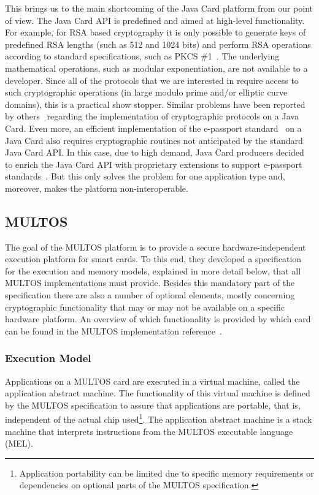 This brings us to the main shortcoming of the Java Card platform from our point
of view. The Java Card API is predefined and aimed at high-level functionality.
For example, for RSA based cryptography it is only possible to generate keys of
predefined RSA lengths (such as 512 and 1024 bits) and perform RSA operations
according to standard specifications, such as PKCS \#1~\cite{PKCS_1}. The
underlying mathematical operations, such as modular exponentiation, are not
available to a developer. Since all of the protocols that we are interested in
require access to such cryptographic operations (in large modulo prime and/or
elliptic curve domains), this is a practical show stopper. Similar problems have
been reported by others~\cite{BichselCGS2009,Sterckx09} regarding the implementation of
cryptographic protocols on a Java Card. Even more, an efficient implementation
of the e-passport standard~\cite{EAC20} on a Java Card also requires
cryptographic routines not anticipated by the standard Java Card API. In this
case, due to high demand, Java Card producers decided to enrich the Java Card
API with proprietary extensions to support e-passport standards~\cite{NXP09}.
But this only solves the problem for one application type and, moreover, makes
the platform non-interoperable.

\subsection{MULTOS}\label{sec:multos}

The goal of the MULTOS platform is to provide a secure hardware-independent
execution platform for smart cards. To this end, they developed a specification
for the execution and memory models, explained in more detail below, that all
MULTOS implementations must provide. Besides this mandatory part of the
specification there are also a number of optional elements, mostly concerning
cryptographic functionality that may or may not be available on a specific
hardware platform. An overview of which functionality is provided by which card
can be found in the MULTOS implementation reference~\cite{MIR2012}.

\subsubsection{Execution Model}

Applications on a MULTOS card are executed in a virtual machine, called the application abstract machine. The functionality of this
virtual machine is defined by the MULTOS specification to assure that
applications are portable, that is, independent of the actual chip
used\footnote{Application portability can be limited due to specific memory
requirements or dependencies on optional parts of the MULTOS specification.}.
The application abstract machine is a stack machine that
interprets instructions from the MULTOS executable language (MEL).

